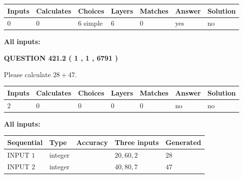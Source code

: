 \documentclass[12pt]{article}
\begin{document}
 
\noindent{}
 
 
   
   
   
   
\noindent\begin{tabular}{|l|l|l|l|l|l|l|}
 \hline
Inputs & Calculates & Choices & Layers & Matches & Answer & Solution \\ \hline
 0  & 
 0  & 
 6
  simple  
  & 
 6  & 
 0  & 
  yes & 
  no 
  \\ \hline
 \end{tabular}
   
   
   
   
\noindent{}
   
   
   
   
\noindent\vspace{0.1in}\hspace{-0.08in} {\textbf{\Large{All inputs: }}}
   
   
  
\vspace{0.2in}
  
{\textbf{\Large{QUESTION
421.2 
 ( 1 , 1 , 6791 )
}}}
  
  
 
Please calculate $ %
28 +  %
47 $.
 
 
   
   
   
   
\noindent\begin{tabular}{|l|l|l|l|l|l|l|}
 \hline
Inputs & Calculates & Choices & Layers & Matches & Answer & Solution \\ \hline
 2  & 
 0  & 
 0
  & 
 0  & 
 0  & 
  no & 
  no 
  \\ \hline
 \end{tabular}
   
   
   
   
\noindent{}
   
   
   
   
\noindent\vspace{0.1in}\hspace{-0.08in} {\textbf{\Large{All inputs: }}}
   
   
  
  
\noindent\begin{tabular}{|l|l|l|l|l|}
\hline
 Sequential & Type & Accuracy & Three inputs & Generated \\ 
\hline
 
 
  INPUT $  1 $ & integer &  & $
 20
 , 
 60
 , 
 2
 $ & $ 28 $ 
 \\  \hline  
 
 
  INPUT $  2 $ & integer &  & $
 40
 , 
 80
 , 
 7
 $ & $ 47 $ 
 \\  \hline  
 \end{tabular}
   
\end{document}
